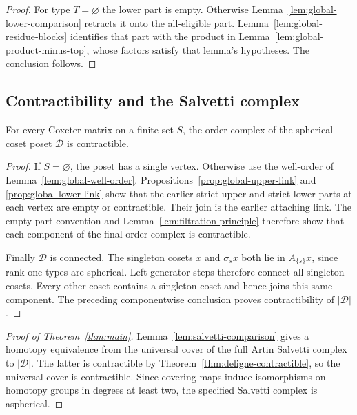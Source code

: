 \begin{proof}
For type $T=\varnothing$ the lower part is empty.  Otherwise
Lemma~\ref{lem:global-lower-comparison} retracts it onto the all-eligible
part.  Lemma~\ref{lem:global-residue-blocks} identifies that part with
the product in Lemma~\ref{lem:global-product-minus-top}, whose factors
satisfy that lemma's hypotheses.  The conclusion follows.
\end{proof}

\subsection{Contractibility and the Salvetti complex}

\begin{theorem}\label{thm:deligne-contractible}
For every Coxeter matrix on a finite set $S$, the order complex of the
spherical-coset poset $\mathcal D$ is contractible.
\end{theorem}

\begin{proof}
If $S=\varnothing$, the poset has a single vertex.  Otherwise use the
well-order of Lemma~\ref{lem:global-well-order}.
Propositions~\ref{prop:global-upper-link} and
\ref{prop:global-lower-link} show that the earlier strict upper and
strict lower parts at each vertex are empty or contractible.  Their
join is the earlier attaching link.  The empty-part convention and
Lemma~\ref{lem:filtration-principle} therefore show that each component
of the final order complex is contractible.

Finally $\mathcal D$ is connected.  The singleton cosets $x$ and
$\sigma_sx$ both lie in $A_{\{s\}}x$, since rank-one types are
spherical.  Left generator steps therefore connect all singleton
cosets.  Every other coset contains a singleton coset and hence joins
this same component.  The preceding componentwise conclusion proves
contractibility of $|\mathcal D|$.
\end{proof}

\begin{proof}[Proof of Theorem~\ref{thm:main}]
Lemma~\ref{lem:salvetti-comparison} gives a homotopy equivalence from
the universal cover of the full Artin Salvetti complex to
$|\mathcal D|$.  The latter is contractible by
Theorem~\ref{thm:deligne-contractible}, so the universal cover is
contractible.  Since covering maps induce isomorphisms on homotopy
groups in degrees at least two, the specified Salvetti complex is
aspherical.
\end{proof}

